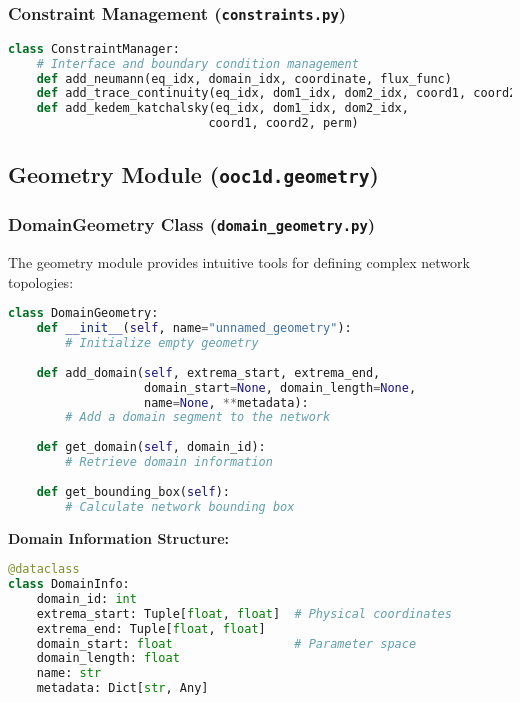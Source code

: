 \documentclass[11pt,a4paper]{article}
\newcommand{\code}[1]{\texttt{#1}}
\begin{document}
\subsubsection{Constraint Management (\code{constraints.py})}

\begin{lstlisting}[language=Python, caption={Constraint Manager Methods}]
class ConstraintManager:
    # Interface and boundary condition management
    def add_neumann(eq_idx, domain_idx, coordinate, flux_func)
    def add_trace_continuity(eq_idx, dom1_idx, dom2_idx, coord1, coord2)
    def add_kedem_katchalsky(eq_idx, dom1_idx, dom2_idx, 
                            coord1, coord2, perm)
\end{lstlisting}

\subsection{Geometry Module (\code{ooc1d.geometry})}

\subsubsection{DomainGeometry Class (\code{domain\_geometry.py})}

The geometry module provides intuitive tools for defining complex network topologies:

\begin{lstlisting}[language=Python, caption={DomainGeometry Class}]
class DomainGeometry:
    def __init__(self, name="unnamed_geometry"):
        # Initialize empty geometry
    
    def add_domain(self, extrema_start, extrema_end, 
                   domain_start=None, domain_length=None, 
                   name=None, **metadata):
        # Add a domain segment to the network
        
    def get_domain(self, domain_id):
        # Retrieve domain information
        
    def get_bounding_box(self):
        # Calculate network bounding box
\end{lstlisting}

\textbf{Domain Information Structure:}
\begin{lstlisting}[language=Python, caption={Domain Information Dataclass}]
@dataclass
class DomainInfo:
    domain_id: int
    extrema_start: Tuple[float, float]  # Physical coordinates
    extrema_end: Tuple[float, float]
    domain_start: float                 # Parameter space
    domain_length: float
    name: str
    metadata: Dict[str, Any]
\end{lstlisting}
\end{document}
